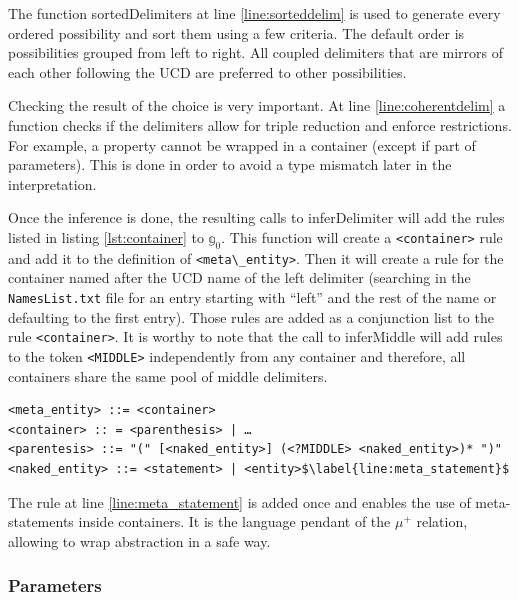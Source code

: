 \documentclass[11pt,a4paper,twoside,openright,titlepage,numbers=noenddot,headinclude,cleardoublepage=empty,openany]{scrreprt}
\theoremstyle{plain}
\theoremstyle{definition}
\theoremstyle{remark}
\newcommand{\passthrough}[1]{#1}
\newcommand{\bb}{\mathbb}
\begin{document}
The function sortedDelimiters at line \ref{line:sorteddelim} is used to
generate every ordered possibility and sort them using a few criteria.
The default order is possibilities grouped from left to right. All
coupled delimiters that are mirrors of each other following the UCD are
preferred to other possibilities.

Checking the result of the choice is very important. At
line \ref{line:coherentdelim} a function checks if the delimiters allow
for triple reduction and enforce restrictions. For example, a property
cannot be wrapped in a container (except if part of parameters). This is
done in order to avoid a type mismatch later in the interpretation.

Once the inference is done, the resulting calls to inferDelimiter will
add the rules listed in listing \ref{lst:container} to \(\bb{g}_0\).
This function will create a \passthrough{\lstinline!<container>!} rule
and add it to the definition of
\passthrough{\lstinline!<meta\_entity>!}. Then it will create a rule for
the container named after the UCD name of the left delimiter (searching
in the \passthrough{\lstinline!NamesList.txt!} file for an entry
starting with ``left'' and the rest of the name or defaulting to the
first entry). Those rules are added as a conjunction list to the rule
\passthrough{\lstinline!<container>!}. It is worthy to note that the
call to inferMiddle will add rules to the token
\passthrough{\lstinline!<MIDDLE>!} independently from any container and
therefore, all containers share the same pool of middle delimiters.

\begin{lstlisting}[caption={Rules added to the current grammar for handling the new container for parenthesis}, escapechar={$}, label=lst:container]
<meta_entity> ::= <container>
<container> :: = <parenthesis> | …
<parentesis> ::= "(" [<naked_entity>] (<?MIDDLE> <naked_entity>)* ")"
<naked_entity> ::= <statement> | <entity>$\label{line:meta_statement}$
\end{lstlisting}

The rule at line \ref{line:meta_statement} is added once and enables the
use of meta-statements inside containers. It is the language pendant of
the \(\mu^+\) relation, allowing to wrap abstraction in a safe way.

\hypertarget{parameters}{%
\subsubsection{Parameters}\label{parameters}}
\end{document}
